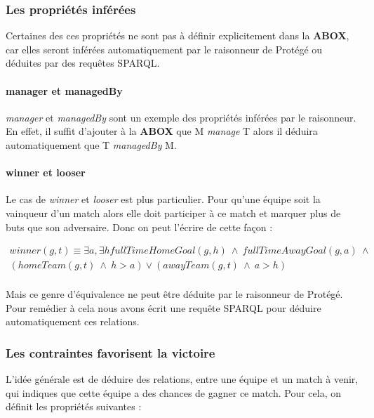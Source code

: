 \documentclass[oneside,13pt,a4paper]{article}
\begin{document}
\subsubsection{Les propriétés inférées}

Certaines des ces propriétés ne sont pas à définir explicitement dans la \textbf{ABOX}, car elles seront inférées automatiquement par le raisonneur de Protégé ou déduites par des requêtes SPARQL.

\paragraph{manager et managedBy}

\textit{manager} et \textit{managedBy} sont un exemple des propriétés inférées par le raisonneur. En effet, il suffit d'ajouter à la \textbf{ABOX} que M \textit{manage} T alors il déduira automatiquement que T \textit{managedBy} M.

\paragraph{winner et looser}
\label{winner}

Le cas de \textit{winner} et \textit{looser} est plus particulier. Pour qu’une équipe soit la vainqueur d’un match alors elle doit participer à ce match et marquer plus de buts que son adversaire. Donc on peut l’écrire de cette façon :

\begin{multline*}
winner(g,t) \equiv \exists a,\exists h  fullTimeHomeGoal(g,h) \ \wedge \ fullTimeAwayGoal(g, a) \ \wedge \ \\
  (homeTeam(g,t) \ \wedge \ h > a)  \vee (awayTeam(g,t) \ \wedge \  a > h) \\
\end{multline*}

Mais ce genre d'équivalence ne peut être déduite par le raisonneur de Protégé. Pour remédier à cela nous avons écrit une requête SPARQL pour déduire automatiquement ces relations.



\subsubsection{Les contraintes favorisent la victoire}

L'idée générale est de déduire des relations, entre une équipe et un match à venir, qui indiques que cette équipe a des chances de gagner ce match. Pour cela, on définit les propriétés suivantes : 
\end{document}
